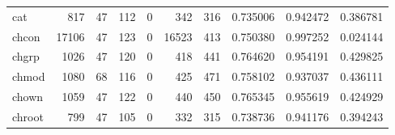 \begin{longtable}{lrrrrrrrrr}
cat       &                                                817 &                                                 47 &                                                112 &                                                  0 &                                                342 &                                                316 &                                           0.735006 &                               0.942472 &                             0.386781 \\
chcon     &                                              17106 &                                                 47 &                                                123 &                                                  0 &                                              16523 &                                                413 &                                           0.750380 &                               0.997252 &                             0.024144 \\
chgrp     &                                               1026 &                                                 47 &                                                120 &                                                  0 &                                                418 &                                                441 &                                           0.764620 &                               0.954191 &                             0.429825 \\
chmod     &                                               1080 &                                                 68 &                                                116 &                                                  0 &                                                425 &                                                471 &                                           0.758102 &                               0.937037 &                             0.436111 \\
chown     &                                               1059 &                                                 47 &                                                122 &                                                  0 &                                                440 &                                                450 &                                           0.765345 &                               0.955619 &                             0.424929 \\
chroot    &                                                799 &                                                 47 &                                                105 &                                                  0 &                                                332 &                                                315 &                                           0.738736 &                               0.941176 &                             0.394243 \\

\end{longtable}

